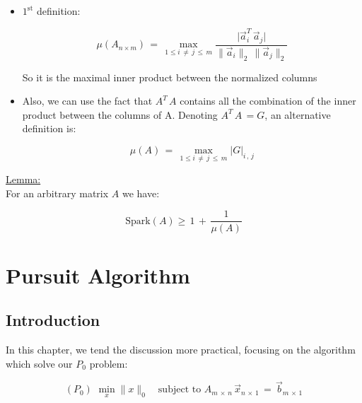 \documentclass[12pt,a4paper]{book}
\begin{document}
\begin{itemize}
    \item $\mathrm{1}^\mathrm{st}$ definition:
    
    \begin{equation}
        \mu(A_{n \times m}) \, = \, \max_{1 \leq i \, \neq \, j \, \leq \, m} \displaystyle\frac{\lvert  \Vec{a}_i^T \, \Vec{a}_j \rvert}{\lVert \Vec{a}_i \rVert_2 \, \lVert \Vec{a}_j \rVert_2}
    \end{equation}
    
    So it is the maximal inner product between the normalized columns
    
    \item Also, we can use the fact that $A^T \, A$ contains all the combination of the inner product between the columns of A. Denoting $A^T \, A \, = G$, an alternative definition is:
    
    \begin{equation}
        \mu(A) \, = \, \max_{1 \leq i \, \neq \, j \, \leq \, m} \lvert G \rvert_{i \, , \, j}
    \end{equation}
    
\end{itemize}


\underline{Lemma:}\\

For an arbitrary matrix $A$ we have:


\begin{equation}
    \text{Spark}(A) \geq \, 1 \, + \, \displaystyle\frac{1}{\mu(A)}
\end{equation}




\chapter{Pursuit Algorithm}

\section{Introduction}

In this chapter, we tend the discussion more practical, focusing on the algorithm which solve our $P_0$ problem:


\begin{equation}
(P_0) \, \,   \min_x \lVert x \rVert_0 \quad \text{subject to }  A_{m \, \times \, n} \, \Vec{x}_{n \, \times \, 1} \, = \, \Vec{b}_{m \, \times \, 1}
\label{Eq:2_Ortho_Case:P0_Problem_2}
\end{equation}
\end{document}
